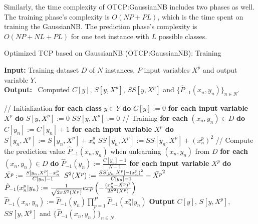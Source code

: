 \documentclass[10pt]{reportMaster}
\begin{document}
\noindent Similarly, the time complexity of OTCP:GaussianNB includes two phases as well. The training phase's complexity is $O(NP+PL)$, which is the time spent on training the GaussianNB. The prediction phase's complexity is $O(NP+NL+PL)$ for one test instance with $L$ possible classes. 

\begin{algorithm}[H]
\caption{Optimized TCP based on GaussianNB (OTCP:GaussianNB): Training}\label{alg:OTCPG-Training}
\textbf{Input:} \; \; Training dataset $D$ of $N$ instances, $P$ input variables $X^p$ and output variable $Y$.\\
\textbf{Output:} \, Computed $C[y]$, $S[y, X^p]$, $SS[y, X^p]$ and $\{\hat{P}_{-1}(x_n,y_n)\}_{n \in N}$.

\begin{algorithmic}[1]
\State // Initialization
\State \textbf{for each class} $y \in Y$ \textbf{do}
\State \qquad $C[y] := 0$
\State \qquad \textbf{for each input variable} $X^p$ \textbf{do}
\State \qquad \qquad $S[y,X^p] := 0$
\State \qquad \qquad $SS[y,X^p] := 0$
\State // Training
\State \textbf{for each} $(x_n,y_n) \in D$ \textbf{do}
\State \qquad $C[y_n] := C[y_n]+1$
\State \qquad \textbf{for each input variable} $X^p$ \textbf{do}
\State \qquad \qquad $S[y_n,X^p] := S[y_n,X^p] + x_n^p$
\State \qquad \qquad $SS[y_n,X^p] := SS[y_n,X^p] + (x_n^p)^2$
\State // Compute the prediction value $\hat{P}_{-1}(x_n,y_n)$ when unlearning $(x_n,y_n)$ from $D$
\State \textbf{for each} $(x_n,y_n) \in D$ \textbf{do}
\State \qquad $\hat{P}_{-1}(y_n) := \frac{C[y_n]-1}{N-1}$
\State \qquad \textbf{for each input variable} $X^p$ \textbf{do}
\State \qquad \qquad $\Bar{X^p}:=\frac{S[y_n,X^p]-x_n^p}{C[y_n]-1}$
\State \qquad \qquad $S^2(X^p):=\frac{SS[y_n,X^p]-(x_n^p)^2}{C[y_n]-1}-\Bar{X^p}^2$
\State \qquad \qquad $\hat{P}_{-1}(x_n^p|y_n):=\frac{1}{\sqrt{2 \pi S^2(X^p)}}exp\left(-\frac{(x_n^p-\Bar{X^p})^2}{2S^2(X^p)}\right)$
\State \qquad $\hat{P}_{-1}(x_n,y_n):=\hat{P}_{-1}(y_n) \prod_{p=1}^P \hat{P}_{-1}(x_n^p|y_n)$
\State \textbf{Output} $C[y]$, $S[y, X^p]$, $SS[y, X^p]$ and $\{\hat{P}_{-1}(x_n,y_n)\}_{n \in N}$
\end{algorithmic}
\end{algorithm}
\end{document}
